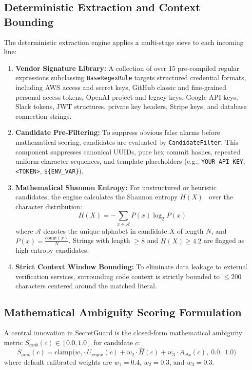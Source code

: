 \subsection{Deterministic Extraction and Context Bounding}
The deterministic extraction engine applies a multi-stage sieve to each incoming line:
\begin{enumerate}
    \item \textbf{Vendor Signature Library:} A collection of over 15 pre-compiled regular expressions subclassing \texttt{BaseRegexRule} targets structured credential formats, including AWS access and secret keys, GitHub classic and fine-grained personal access tokens, OpenAI project and legacy keys, Google API keys, Slack tokens, JWT structures, private key headers, Stripe keys, and database connection strings.
    \item \textbf{Candidate Pre-Filtering:} To suppress obvious false alarms before mathematical scoring, candidates are evaluated by \texttt{CandidateFilter}. This component suppresses canonical UUIDs, pure hex commit hashes, repeated uniform character sequences, and template placeholders (e.g., \texttt{YOUR\_API\_KEY}, \texttt{<TOKEN>}, \texttt{\$\{ENV\_VAR\}}).
    \item \textbf{Mathematical Shannon Entropy:} For unstructured or heuristic candidates, the engine calculates the Shannon entropy $H(X)$~\cite{shannon1948mathematical} over the character distribution:
    \begin{equation}
        H(X) = -\sum_{x \in \mathcal{A}} P(x) \log_2 P(x)
    \end{equation}
    where $\mathcal{A}$ denotes the unique alphabet in candidate $X$ of length $N$, and $P(x) = \frac{\text{count}(x)}{N}$. Strings with length $\ge 8$ and $H(X) \ge 4.2$ are flagged as high-entropy candidates.
    \item \textbf{Strict Context Window Bounding:} To eliminate data leakage to external verification services, surrounding code context is strictly bounded to $\le 200$ characters centered around the matched literal.
\end{enumerate}

\subsection{Mathematical Ambiguity Scoring Formulation}
A central innovation in SecretGuard is the closed-form mathematical ambiguity metric $S_{amb}(c) \in [0.0, 1.0]$ for candidate $c$:
\begin{equation}
    S_{amb}(c) = \text{clamp}\Big( w_1 \cdot U_{regex}(c) + w_2 \cdot \hat{H}(c) + w_3 \cdot A_{ctx}(c),\; 0.0,\; 1.0 \Big)
    \label{eq:ambiguity}
\end{equation}
where default calibrated weights are $w_1 = 0.4$, $w_2 = 0.3$, and $w_3 = 0.3$.

